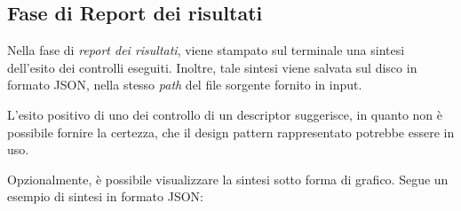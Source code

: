 \subsection{Fase di Report dei risultati}
Nella fase di \textit{report dei risultati}, viene stampato sul terminale una sintesi dell'esito dei controlli eseguiti. Inoltre, tale sintesi viene salvata sul disco in formato JSON, nella stesso \textit{path} del file sorgente fornito in input.\par
L'esito positivo di uno dei controllo di un descriptor suggerisce, in quanto non è possibile fornire la certezza, che il design pattern rappresentato potrebbe essere in uso.\par
Opzionalmente, è possibile visualizzare la sintesi sotto forma di grafico.
\newline
Segue un esempio di sintesi in formato JSON:
